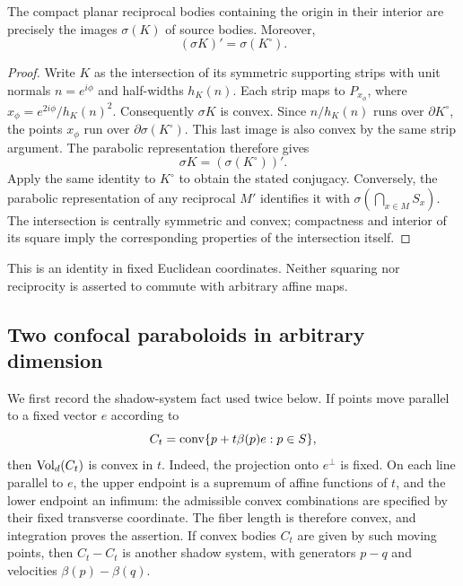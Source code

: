 \begin{theorem}
The compact planar reciprocal bodies containing the origin in their interior are precisely the images $\sigma(K)$ of source bodies. Moreover,
\[
 (\sigma K)'=\sigma(K^\circ).
\]
\end{theorem}
\begin{proof}
Write $K$ as the intersection of its symmetric supporting strips with unit normals $n=e^{i\phi}$ and half-widths $h_K(n)$. Each strip maps to $P_{x_\phi}$, where $x_\phi=e^{2i\phi}/h_K(n)^2$. Consequently $\sigma K$ is convex. Since $n/h_K(n)$ runs over $\partial K^\circ$, the points $x_\phi$ run over $\partial\sigma(K^\circ)$. This last image is also convex by the same strip argument. The parabolic representation therefore gives
\[
 \sigma K=(\sigma(K^\circ))'.
\]
Apply the same identity to $K^\circ$ to obtain the stated conjugacy. Conversely, the parabolic representation of any reciprocal $M'$ identifies it with $\sigma(\bigcap_{x\in M}S_x)$. The intersection is centrally symmetric and convex; compactness and interior of its square imply the corresponding properties of the intersection itself.
\end{proof}
This is an identity in fixed Euclidean coordinates. Neither squaring nor reciprocity is asserted to commute with arbitrary affine maps.

\subsection{Two confocal paraboloids in arbitrary dimension}

We first record the shadow-system fact used twice below. If points move
parallel to a fixed vector $e$ according to
\[
 C_t=\operatorname{conv}\{p+t\beta(p)e:p\in S\},
\]
then $\operatorname{Vol}_d(C_t)$ is convex in $t$. Indeed, the projection onto
$e^\perp$ is fixed. On each line parallel to $e$, the upper endpoint is
a supremum of affine functions of $t$, and the lower endpoint an infimum:
the admissible convex combinations are specified by their fixed transverse
coordinate. The fiber length is therefore convex, and integration proves
the assertion. If convex bodies $C_t$ are given by such moving points,
then $C_t-C_t$ is another shadow system, with generators $p-q$ and
velocities $\beta(p)-\beta(q)$.

